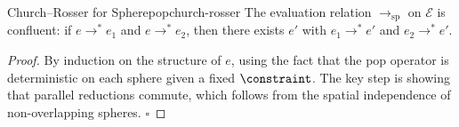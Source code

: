 \begin{theorem}{Church–Rosser for Spherepop}{church-rosser}
  The evaluation relation $\to_{\mathrm{sp}}$ on $\mathcal{E}$ is
  confluent: if $e \to^* e_1$ and $e \to^* e_2$, then there exists
  $e'$ with $e_1 \to^* e'$ and $e_2 \to^* e'$.
\end{theorem}

\begin{proof}
  By induction on the structure of $e$, using the fact that the pop
  operator is deterministic on each sphere given a fixed $\constraint$.
  The key step is showing that parallel reductions commute, which follows
  from the spatial independence of non-overlapping spheres. \hfill$\square$
\end{proof}
